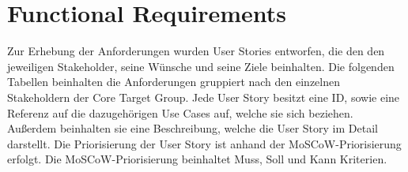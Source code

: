 \chapter{Functional Requirements}
Zur Erhebung der Anforderungen wurden User Stories entworfen, die den den jeweiligen Stakeholder, seine Wünsche und seine Ziele beinhalten. Die folgenden Tabellen beinhalten die Anforderungen gruppiert nach den einzelnen Stakeholdern der Core Target Group. Jede User Story besitzt eine ID, sowie eine Referenz auf die dazugehörigen Use Cases auf, welche sie sich beziehen. Außerdem beinhalten sie eine Beschreibung, welche die User Story im Detail darstellt. Die Priorisierung der User Story ist anhand der MoSCoW-Priorisierung erfolgt. Die MoSCoW-Priorisierung beinhaltet Muss, Soll und Kann Kriterien. 

